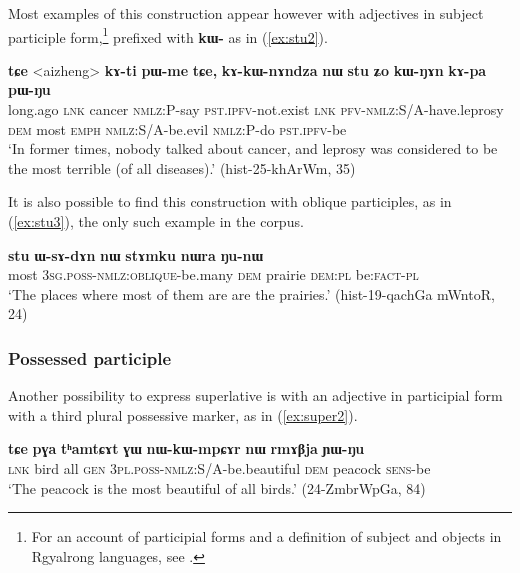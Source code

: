 \documentclass[oneside,a4paper,11pt]{article}
\newcommand{\ipa}[1]{{\phon\textbf{#1}}} %
\begin{document}
Most examples of this construction appear however with adjectives in subject participle form,\footnote{For an account of participial forms and a definition of subject and objects  in Rgyalrong languages, see \citet{jackson03caodeng, jackson14morpho, jacques16relatives}.} prefixed with \ipa{kɯ-} as in (\ref{ex:stu2}).

\begin{exe}
\ex \label{ex:stu2}
\gll \ipa{kɯɕɯŋgɯ} 	\ipa{tɕe} 	<aizheng> 	\ipa{kɤ-ti} 	\ipa{pɯ-me} 	\ipa{tɕe,} 	\ipa{kɤ-kɯ-nɤndza} 	\ipa{nɯ} 	\ipa{stu} 	\ipa{ʑo} 	\ipa{kɯ-ŋɤn} 	\ipa{kɤ-pa} 	\ipa{pɯ-ŋu} \\
long.ago \textsc{lnk} cancer \textsc{nmlz}:P-say \textsc{pst.ipfv}-not.exist \textsc{lnk} \textsc{pfv}-\textsc{nmlz}:S/A-have.leprosy \textsc{dem} most \textsc{emph} \textsc{nmlz}:S/A-be.evil \textsc{nmlz}:P-do \textsc{pst.ipfv}-be \\
\glt `In former times, nobody talked about cancer, and leprosy was considered to be the most terrible (of all diseases).' (hist-25-khArWm, 35)
\end{exe}

It is also possible to find this construction with oblique participles, as in (\ref{ex:stu3}), the only such example in the corpus.

\begin{exe}
\ex \label{ex:stu3}
\gll 
\ipa{stu} 	\ipa{ɯ-sɤ-dɤn} 	\ipa{nɯ} 	\ipa{stɤmku} 	\ipa{nɯra} 	\ipa{ŋu-nɯ} \\
most \textsc{3sg.poss-nmlz:oblique}-be.many \textsc{dem} prairie \textsc{dem:pl} be:\textsc{fact-pl} \\
\glt `The places where most of them are are the prairies.' (hist-19-qachGa mWntoR, 24)
\end{exe}

 \subsubsection{Possessed participle}
Another possibility to express superlative is with an adjective in participial form  with a third plural possessive marker, as in (\ref{ex:super2}).
 
 \begin{exe}
\ex \label{ex:super2}
\gll 
\ipa{tɕe} 	\ipa{pɣa} 	\ipa{tʰamtɕɤt} 	\ipa{ɣɯ} 	\ipa{nɯ-kɯ-mpɕɤr} 	\ipa{nɯ} 	\ipa{rmɤβja} 	\ipa{ɲɯ-ŋu} \\
\textsc{lnk} bird all \textsc{gen} \textsc{3pl.poss-nmlz}:S/A-be.beautiful \textsc{dem} peacock \textsc{sens}-be \\
\glt  `The peacock is the most beautiful of all birds.' (24-ZmbrWpGa, 84)
\end{exe}
\end{document}
